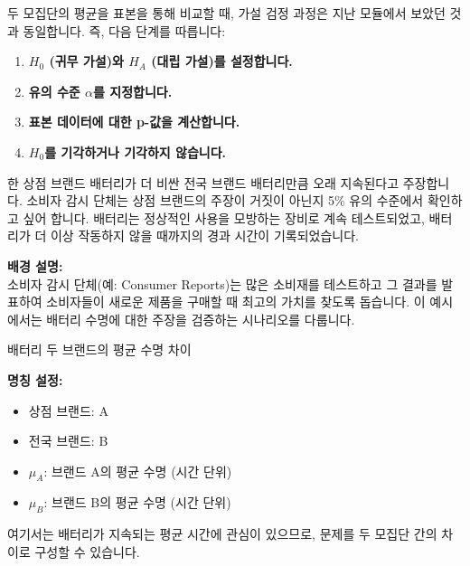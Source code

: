 \documentclass[11pt,a4paper]{book}
\theoremstyle{definition}
\begin{document}
\begin{infobox}[title=두 평균에 대한 가설 검정 절차]
두 모집단의 평균을 표본을 통해 비교할 때, 가설 검정 과정은 지난 모듈에서 보았던 것과 동일합니다. 즉, 다음 단계를 따릅니다:
\begin{enumerate}
    \item \textbf{$H_0$ (귀무 가설)와 $H_A$ (대립 가설)를 설정합니다.}
    \item \textbf{유의 수준 $\alpha$를 지정합니다.}
    \item \textbf{표본 데이터에 대한 p-값을 계산합니다.}
    \item \textbf{$H_0$를 기각하거나 기각하지 않습니다.}
\end{enumerate}
\end{infobox}

\begin{examplebox}[title=예시 1: 배터리 수명 비교 - 문제 정의]
한 상점 브랜드 배터리가 더 비싼 전국 브랜드 배터리만큼 오래 지속된다고 주장합니다. 소비자 감시 단체는 상점 브랜드의 주장이 거짓이 아닌지 5\% 유의 수준에서 확인하고 싶어 합니다. 배터리는 정상적인 사용을 모방하는 장비로 계속 테스트되었고, 배터리가 더 이상 작동하지 않을 때까지의 경과 시간이 기록되었습니다.

\textbf{배경 설명:} \\
소비자 감시 단체(예: Consumer Reports)는 많은 소비재를 테스트하고 그 결과를 발표하여 소비자들이 새로운 제품을 구매할 때 최고의 가치를 찾도록 돕습니다. 이 예시에서는 배터리 수명에 대한 주장을 검증하는 시나리오를 다룹니다.
\end{examplebox}

\begin{infobox}[title=두 브랜드 비교 (1/8): 문제 정의 및 변수 설정]
배터리 두 브랜드의 평균 수명 차이

\textbf{명칭 설정:}
\begin{itemize}
    \item 상점 브랜드: A
    \item 전국 브랜드: B
    \item $\mu_A$: 브랜드 A의 평균 수명 (시간 단위)
    \item $\mu_B$: 브랜드 B의 평균 수명 (시간 단위)
\end{itemize}
여기서는 배터리가 지속되는 평균 시간에 관심이 있으므로, 문제를 두 모집단 간의 차이로 구성할 수 있습니다.
\end{infobox}
\end{document}
